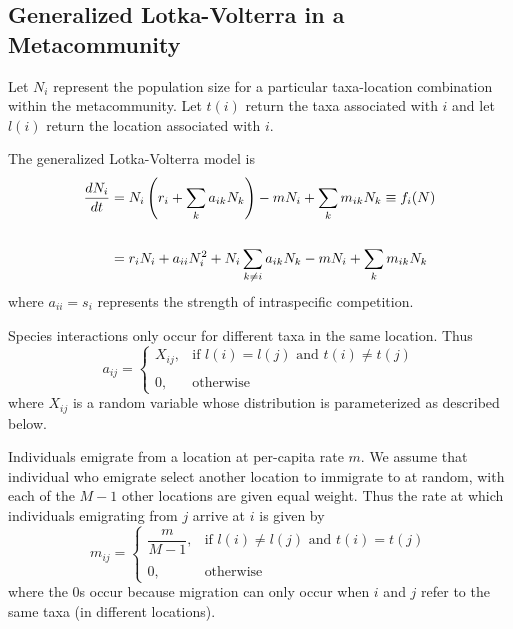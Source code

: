 \documentclass{article}
\begin{document}
\subsection*{Generalized Lotka-Volterra in a Metacommunity}

Let $N_i$ represent the population size for a particular taxa-location combination within the metacommunity. Let $t(i)$ return the taxa associated with $i$ and let $l(i)$ return the location associated with $i$.

The generalized Lotka-Volterra model is
\begin{align}
\dfrac{dN_i}{dt} 
&= N_i\left(r_i+\sum_k a_{ik}N_k\right)-mN_i+\sum_k m_{ik}N_k \equiv f_i(N) \\
\notag\\
&=r_iN_i + a_{ii}N_i^2 + N_i\sum_{k\neq i} a_{ik}N_k - mN_i + \sum_k m_{ik} N_k
\end{align}
where $a_{ii} = s_i$ represents the strength of intraspecific competition.

Species interactions only occur for different taxa in the same location. Thus
\begin{equation}
    a_{ij} = 
    \left\{
        \begin{array}{ll}
            X_{ij}, & \text{if } l(i) = l(j) \text{ and } t(i) \neq t(j)\\
            \\
            0, & \text{otherwise}
            \end{array}
            \right.
\end{equation}
where $X_{ij}$ is a random variable whose distribution is parameterized as described below.

Individuals emigrate from a location at per-capita rate $m$. We assume that individual who emigrate select another location to immigrate to at random, with each of the $M-1$ other locations are given equal weight. Thus the rate at which individuals emigrating from $j$ arrive at $i$ is given by
\begin{equation}
    m_{ij} = 
    \left\{
        \begin{array}{ll}
            \dfrac{m}{M-1}, & \text{if } l(i) \neq l(j) \text{ and } t(i) = t(j) \\
            \\
            0, & \text{otherwise}
        \end{array}
        \right.
\end{equation}
where the 0s occur because migration can only occur when $i$ and $j$ refer to the same taxa (in different locations).
\end{document}
